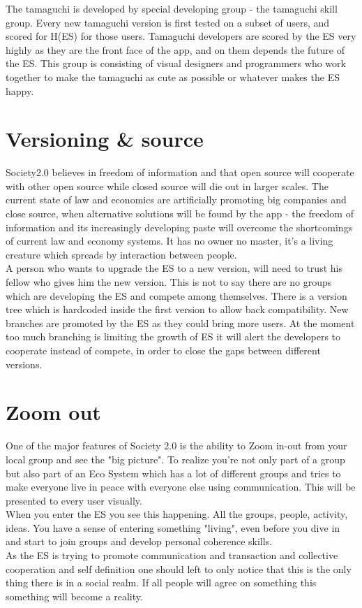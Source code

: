 \documentclass{article}
\begin{document}
The tamaguchi is developed by special developing group - the tamaguchi skill group. Every new tamaguchi version is first tested on a subset of users, and scored for H(ES) for those users. Tamaguchi developers are scored by the ES very highly as they are the front face of the app, and on them depends the future of the ES. This group is consisting of visual designers and programmers who work together to make the tamaguchi as cute as possible or whatever makes the ES happy. 

\section{Versioning \& source}

Society2.0 believes in freedom of information and that open source will cooperate with other open source while closed source will die out in larger scales. The current state of law and economics are artificially promoting big companies and close source, when alternative solutions will be found by the app - the freedom of information and its increasingly developing paste will overcome the shortcomings of current law and economy systems. It has no owner no master, it's a living creature which spreads by interaction between people. \\

A person who wants to upgrade the ES to a new version, will need to trust his fellow who gives him the new version. This is not to say there are no groups which are developing the ES and compete among themselves. There is a version tree which is hardcoded inside the first version to allow back compatibility. New branches are promoted by the ES as they could bring more users. At the moment too much branching is limiting the growth of ES it will alert the developers to cooperate instead of compete, in order to close the gaps between different versions. 

\section{Zoom out}

One of the major features of Society 2.0 is the ability to Zoom in-out from your local group and see the "big picture". To realize you're not only part of a group but also part of an Eco System which has a lot of different groups and tries to make everyone live in peace with everyone else using communication. This will be presented to every user visually. \\

When you enter the ES you see this happening. All the groups, people, activity, ideas. You have a sense of entering something "living", even before you dive in and start to join groups and develop personal coherence skills. \\

As the ES is trying to promote communication and transaction and collective cooperation and self definition one should left to only notice that this is the only thing there is in a social realm. If all people will agree on something this something will become a reality. \\
\end{document}
